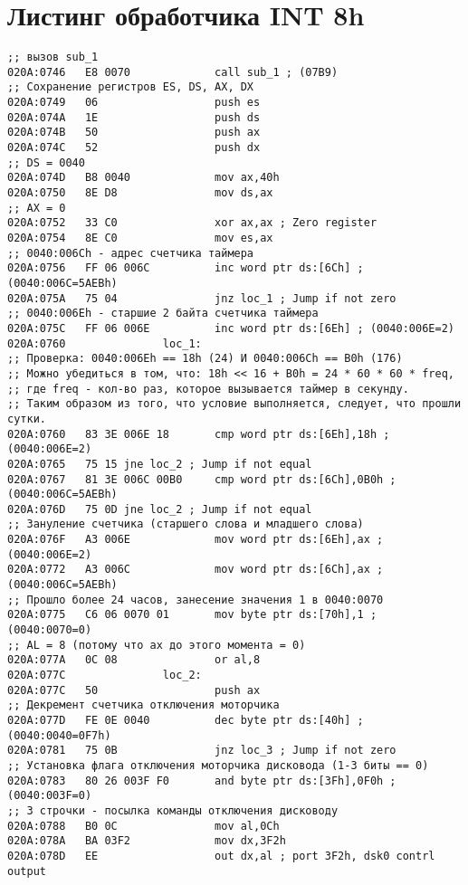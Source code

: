 \section*{Листинг обработчика INT 8h}

\begin{lstlisting}[style={asm}]
;; вызов sub_1
020A:0746   E8 0070             call sub_1 ; (07B9)
;; Сохранение регистров ES, DS, AX, DX
020A:0749   06                  push es
020A:074A   1E                  push ds
020A:074B   50                  push ax
020A:074C   52                  push dx
;; DS = 0040
020A:074D   B8 0040             mov ax,40h
020A:0750   8E D8               mov ds,ax
;; AX = 0
020A:0752   33 C0               xor ax,ax ; Zero register
020A:0754   8E C0               mov es,ax
;; 0040:006Ch - адрес счетчикa таймера
020A:0756   FF 06 006C          inc word ptr ds:[6Ch] ; (0040:006C=5AEBh)
020A:075A   75 04               jnz loc_1 ; Jump if not zero
;; 0040:006Еh - старшие 2 байта счетчика таймера
020A:075C   FF 06 006E          inc word ptr ds:[6Eh] ; (0040:006E=2)
020A:0760               loc_1:
;; Проверка: 0040:006Eh == 18h (24) И 0040:006Ch == B0h (176)
;; Можно убедиться в том, что: 18h << 16 + B0h = 24 * 60 * 60 * freq, 
;; где freq - кол-во раз, которое вызывается таймер в секунду.
;; Таким образом из того, что условие выполняется, следует, что прошли сутки.
020A:0760   83 3E 006E 18       cmp word ptr ds:[6Eh],18h ; (0040:006E=2)
020A:0765   75 15 jne loc_2 ; Jump if not equal
020A:0767   81 3E 006C 00B0     cmp word ptr ds:[6Ch],0B0h ; (0040:006C=5AEBh)
020A:076D   75 0D jne loc_2 ; Jump if not equal
;; Зануление счетчика (старшего слова и младшего слова)
020A:076F   A3 006E             mov word ptr ds:[6Eh],ax ; (0040:006E=2)
020A:0772   A3 006C             mov word ptr ds:[6Ch],ax ; (0040:006C=5AEBh)
;; Прошло более 24 часов, занесение значения 1 в 0040:0070
020A:0775   C6 06 0070 01       mov byte ptr ds:[70h],1 ; (0040:0070=0)
;; AL = 8 (потому что ax до этого момента = 0)
020A:077A   0C 08               or al,8
020A:077C               loc_2:
020A:077C   50                  push ax
;; Декремент счетчика отключения моторчика
020A:077D   FE 0E 0040          dec byte ptr ds:[40h] ; (0040:0040=0F7h)
020A:0781   75 0B               jnz loc_3 ; Jump if not zero
;; Установка флага отключения моторчика дисковода (1-3 биты == 0)
020A:0783   80 26 003F F0       and byte ptr ds:[3Fh],0F0h ; (0040:003F=0)
;; 3 строчки - посылка команды отключения дисководу
020A:0788   B0 0C               mov al,0Ch
020A:078A   BA 03F2             mov dx,3F2h
020A:078D   EE                  out dx,al ; port 3F2h, dsk0 contrl output

\end{lstlisting}
